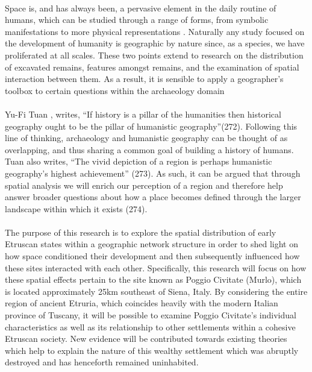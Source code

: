 \documentclass[12pt,a4paper]{thesis}
\begin{document}
\paragraph{}
Space is, and has always been, a pervasive  element in the daily routine of humans, which can be studied through a range of forms, from symbolic manifestations to more physical representations \cite[282]{Harvey06}. Naturally any study focused on the development of humanity is geographic by nature since, as a species, we have proliferated at all scales. These two points extend  to research on the distribution of excavated remains, features amongst remains, and the examination of spatial interaction between them. As a result, it is sensible to apply a geographer's toolbox to certain questions within the archaeology domain \cite[p. 39-42]{Kantner08}

\paragraph{}
Yu-Fi Tuan \citeyearpar{Tuan76}, writes, ``If history is a pillar of the humanities then historical geography ought to be the pillar of humanistic geography''(272). Following this line of thinking, archaeology and humanistic geography can be thought of as overlapping, and thus sharing a common goal of building a history of humans. Tuan also writes, ``The vivid depiction of a region is perhaps humanistic geography's highest achievement'' (273). As such, it can be argued that through spatial analysis we will enrich our perception of a region and therefore help answer broader questions about how a place becomes defined through the larger landscape within which it exists (274).

\paragraph{} 
The purpose of this research is to explore the spatial distribution of early Etruscan states within a geographic network structure in order to shed light on how space conditioned their development  and then subsequently influenced how these sites interacted with each other. Specifically, this research will focus on how these spatial effects  pertain to the site known as Poggio Civitate (Murlo), which is located approximately 25km southeast of Siena, Italy. By considering the entire region of ancient Etruria, which coincides heavily with the modern Italian province of Tuscany, it will be possible to examine Poggio Civitate's individual characteristics as well as its relationship to other settlements within a cohesive Etruscan society. New evidence will be contributed towards existing theories which help to explain the nature of this wealthy settlement which was abruptly destroyed and has henceforth remained uninhabited.
\end{document}
